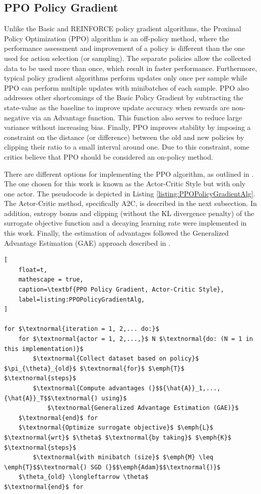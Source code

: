 \documentclass[conference]{IEEEtran}
\begin{document}
\subsection{PPO Policy Gradient}
Unlike the Basic and REINFORCE policy gradient algorithms, the Proximal Policy Optimization (PPO) algorithm is an off-policy method, where the performance assessment and improvement of a policy is different than the one used for action selection (or sampling). The separate policies allow the collected data to be used more than once, which result in faster performance. Furthermore, typical policy gradient algorithms perform updates only once per sample while PPO can perform multiple updates with minibatches of each sample. PPO also addresses other shortcomings of the Basic Policy Gradient by subtracting the state-value as the baseline to improve update accuracy when rewards are non-negative via an Advantage function. This function also serves to reduce large variance without increasing bias. Finally, PPO improves stability by imposing a constraint on the distance (or difference) between the old and new policies by clipping their ratio to a small interval around one. Due to this constraint, some critics believe that PPO should be considered an on-policy method.

There are different options for implementing the PPO algorithm, as outlined in \cite{schulman2017proximal}. The one chosen for this work is known as the Actor-Critic Style but with only one actor. The pseudocode is depicted in Listing \ref{listing:PPOPolicyGradientAlg}. The Actor-Critic method, specifically A2C, is described in the next subsection. In addition, entropy bonus and clipping (without the KL divergence penalty) of the surrogate objective function and a decaying learning rate were implemented in this work. Finally, the estimation of advantages followed the Generalized Advantage Estimation (GAE) approach described in \cite{schulman2018highdimensional}.

\begin{lstlisting}[
    float=t,
    mathescape = true,
    caption=\textbf{PPO Policy Gradient, Actor-Critic Style},
    label=listing:PPOPolicyGradientAlg,
]

for $\textnormal{iteration = 1, 2,... do:}$
    for $\textnormal{actor = 1, 2,...,}$ N $\textnormal{do: (N = 1 in this implementation)}$
        $\textnormal{Collect dataset based on policy}$ $\pi_{\theta}_{old}$ $\textnormal{for}$ $\emph{T}$ $\textnormal{steps}$
        $\textnormal{Compute advantages (}$${\hat{A}}_1,..., {\hat{A}}_T$$\textnormal{) using}$
            $\textnormal{Generalized Advantage Estimation (GAE)}$
    $\textnormal{end}$ for
    $\textnormal{Optimize surrogate objective}$ $\emph{L}$ $\textnormal{wrt}$ $\theta$ $\textnormal{by taking}$ $\emph{K}$ $\textnormal{steps}$
        $\textnormal{with minibatch (size}$ $\emph{M} \leq \emph{T}$$\textnormal{) SGD (}$$\emph{Adam}$$\textnormal{)}$
    $\theta_{old} \longleftarrow \theta$
$\textnormal{end}$ for

\end{lstlisting}
\end{document}
